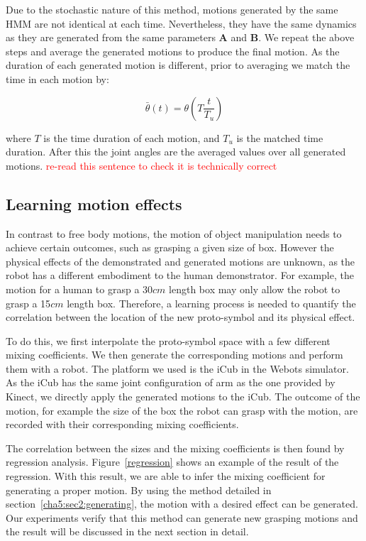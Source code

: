 Due to the stochastic nature of this method, motions generated by the same HMM are not identical at each time. Nevertheless, they have the same dynamics as they are generated from the same parameters $\boldsymbol{A}$ and $\boldsymbol{B}$. We repeat the above steps and average the generated motions to produce the final motion. As the duration of each generated motion is different, prior to averaging we match the time in each motion by:

\begin{equation}
\bar{\theta}\left(t\right)=\theta\left(T\frac{t}{T_u}\right)
\end{equation}

where $T$ is the time duration of each motion, and $T_u$ is the matched time duration. After this the joint angles are the averaged values over all generated motions. \textcolor{red}{re-read this sentence to check it is technically correct}

\subsection{Learning motion effects}
\label{cha5:sec2:learning}

In contrast to free body motions, the motion of object manipulation needs to achieve certain outcomes, such as grasping a given size of box. However the physical effects of the demonstrated and generated motions are unknown, as the robot has a different embodiment to the human demonstrator. For example, the motion for a human to grasp a 30$cm$ length box may only allow the robot to grasp a 15$cm$ length box. Therefore, a learning process is needed to quantify the correlation between the location of the new proto-symbol and its physical effect.

To do this, we first interpolate the proto-symbol space with a few different mixing coefficients. We then generate the corresponding motions and perform them with a robot. The platform we used is the iCub in the Webots simulator. As the iCub has the same joint configuration of arm as the one provided by Kinect, we directly apply the generated motions to the iCub.  The outcome of the motion, for example the size of the box the robot can grasp with the motion, are recorded with their corresponding mixing coefficients.

The correlation between the sizes and the mixing coefficients is then found by regression analysis. Figure~\ref{regression} shows an example of the result of the regression. With this result, we are able to infer the mixing coefficient for generating a proper motion. By using the method detailed in section~\ref{cha5:sec2:generating}, the motion with a desired effect can be generated. Our experiments verify that this method can generate new grasping motions and the result will be discussed in the next section in detail. 